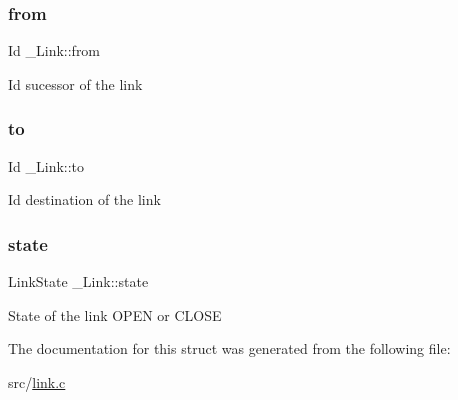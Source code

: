 \subsubsection{\texorpdfstring{from}{from}}
{\footnotesize\ttfamily Id \+\_\+\+Link\+::from}

Id sucessor of the link \mbox{\label{struct__Link_a54563ccd62fdc5057f55fa8f205d928c}} 
\subsubsection{\texorpdfstring{to}{to}}
{\footnotesize\ttfamily Id \+\_\+\+Link\+::to}

Id destination of the link \mbox{\label{struct__Link_a58ecee77b2af4dddadb7e8ff94fa0d15}} 
\subsubsection{\texorpdfstring{state}{state}}
{\footnotesize\ttfamily Link\+State \+\_\+\+Link\+::state}

State of the link O\+P\+EN or C\+L\+O\+SE 

The documentation for this struct was generated from the following file\+:\begin{DoxyCompactItemize}
\item 
src/\hyperlink{link_8c}{link.\+c}\end{DoxyCompactItemize}
